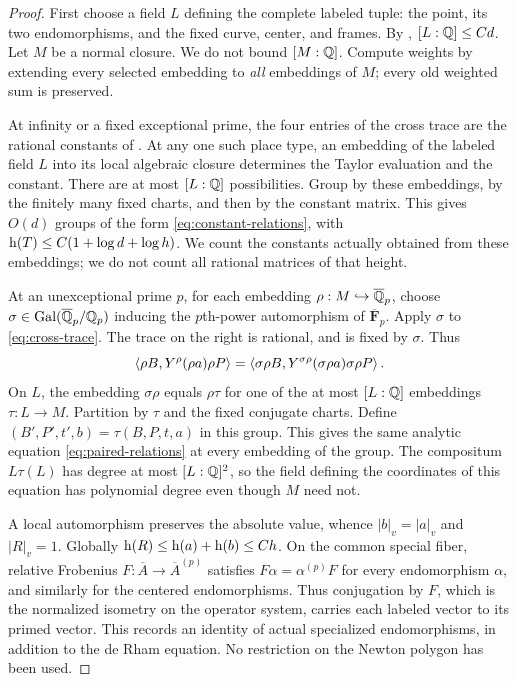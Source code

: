 \begin{proof}
First choose a field $L$ defining the complete labeled tuple:
the point, its two endomorphisms, and the fixed curve, center,
and frames.  By , $[L:\mathbb Q]\le Cd$.
Let $M$ be a normal closure.  We do not bound $[M:\mathbb Q]$.
Compute weights by extending every selected embedding to
\emph{all} embeddings of $M$; every old weighted sum is preserved.

At infinity or a fixed exceptional prime, the four entries of
the cross trace are the rational constants of
.  At any one such place type, an
embedding of the labeled field $L$ into its local algebraic
closure determines the Taylor evaluation and the constant.
There are at most $[L:\mathbb Q]$ possibilities.  Group by these
embeddings, by the finitely many fixed charts, and then by the
constant matrix.  This gives $O(d)$ groups of the form
\eqref{eq:constant-relations}, with
$\mathrm h\!\left(T\right)\le C(1+\log d+\log h)$.
We count the constants actually obtained from these embeddings;
we do not count all rational matrices of that height.

At an unexceptional prime $p$, for each embedding
$\rho:M\hookrightarrow\overline{\mathbb Q}_p$, choose
$\sigma\in\operatorname{Gal}(\overline{\mathbb Q}_p/\mathbb Q_p)$ inducing the $p$th-power automorphism
of $\overline{\mathbf F}_p$.  Apply $\sigma$ to
\eqref{eq:cross-trace}.  The trace on the right is rational,
and is fixed by $\sigma$.  Thus
\[
 \left\langle\rho B,Y^\rho(\rho a)\rho P\right\rangle
  =\left\langle\sigma\rho B,Y^{\sigma\rho}(\sigma\rho a)\sigma\rho P\right\rangle.
\]
On $L$, the embedding $\sigma\rho$ equals $\rho\tau$ for
one of the at most $[L:\mathbb Q]$ embeddings $\tau:L\to M$.
Partition by $\tau$ and the fixed conjugate charts.  Define
$(B',P',t',b)=\tau(B,P,t,a)$ in this group.  This gives the
same analytic equation \eqref{eq:paired-relations} at every
embedding of the group.  The compositum $L\tau(L)$ has
degree at most $[L:\mathbb Q]^2$, so the field defining the
coordinates of this equation has polynomial degree even
though $M$ need not.

A local automorphism preserves the absolute value, whence
$|b|_v=|a|_v$ and $|R|_v=1$.  Globally
$\mathrm h\!\left(R\right)\le\mathrm h\!\left(a\right)+\mathrm h\!\left(b\right)\le Ch$.  On the common special
fiber, relative Frobenius $F:\overline A\to
\overline A^{(p)}$ satisfies $F\alpha=\alpha^{(p)}F$
for every endomorphism $\alpha$, and similarly for the
centered endomorphisms.  Thus conjugation by $F$, which is
the normalized isometry on the operator system, carries
each labeled vector to its primed vector.  This records an
identity of actual specialized endomorphisms, in addition
to the de Rham equation.  No restriction on the Newton
polygon has been used.


\end{proof}
